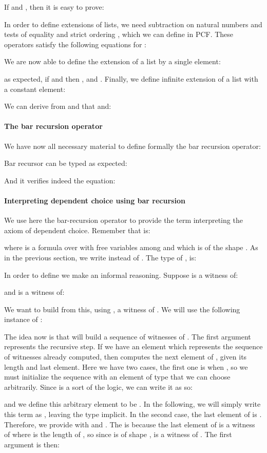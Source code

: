 \documentclass{CSML}
\begin{document}
If  and , then it is easy to prove:

In order to define extensions of lists, we need subtraction on natural numbers  and tests of equality  and strict ordering , which we can define in PCF. These operators satisfy the following equations for :

We are now able to define the extension of a list by a single element:

as expected, if  and  then ,  and . Finally, we define infinite extension of a list with a constant element:

We can derive from  and  that  and:

\paragraph{The bar recursion operator}
\label{barrec}
We have now all necessary material to define formally the bar recursion operator:

Bar recursor can be typed as expected:

And it verifies indeed the equation:

\paragraph{Interpreting dependent choice using bar recursion}
We use here the bar-recursion operator to provide the term  interpreting the axiom of dependent choice. Remember that  is:

where  is a formula over  with free variables among  and which is of the shape . As in the previous section, we write  instead of . The type of ,  is:

In order to define  we make an informal reasoning. Suppose  is a witness of:

and  is a witness of:

We want to build from this, using , a witness of . We will use the following instance of :

The idea now is that  will build a sequence of witnesses of . The first argument represents the recursive step. If we have an element  which represents the sequence of witnesses already computed, then  computes the next element of , given its length and last element. Here we have two cases, the first one is when , so we must initialize the sequence with an element of type  that we can choose arbitrarily. Since  is a sort of the logic, we can write it as  so:

and we define this arbitrary element to be . In the following, we will simply write this term as , leaving the type implicit. In the second case, the last element of  is . Therefore, we provide  with  and . The  is because the last element of  is a witness of  where  is the length of , so since  is of shape ,  is a witness of . The first argument is then:
\end{document}
